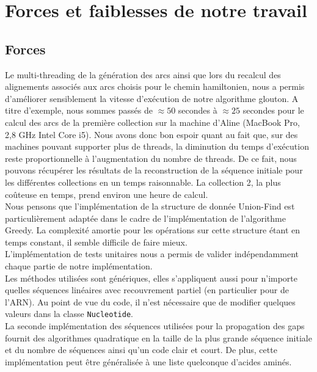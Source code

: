 
\section{Forces et faiblesses de notre travail}

\subsection{Forces}

Le multi-threading de la génération des arcs ainsi que lors du recalcul des alignements associés aux arcs choisis pour le chemin hamiltonien, nous a permis d'améliorer sensiblement la vitesse d'exécution de notre algorithme glouton. A titre d'exemple, nous sommes passés de $\approx 50$ secondes à $\approx 25$ secondes pour le calcul des arcs de la première collection sur la machine d'Aline (MacBook Pro, 2,8 GHz Intel Core i5). Nous avons donc bon espoir quant au fait que, sur des machines pouvant supporter plus de threads, la diminution du temps d'exécution reste proportionnelle à l'augmentation du nombre de threads. De ce fait, nous pouvons récupérer les résultats de la reconstruction de la séquence initiale pour les différentes collections en un temps raisonnable. La collection 2, la plus coûteuse en temps, prend environ une heure de calcul.\\

Nous pensons que l'implémentation de la structure de donnée Union-Find est particulièrement adaptée dans le cadre de l'implémentation de l'algorithme Greedy. La complexité amortie pour les opérations sur cette structure étant en temps constant, il semble difficile de faire mieux.\\

L'implémentation de tests unitaires nous a permis de valider indépendamment chaque partie de notre implémentation.\\

Les méthodes utilisées sont génériques, elles s'appliquent aussi pour n'importe quelles séquences linéaires avec recouvrement partiel (en particulier pour de l'ARN). Au point de vue du code, il n'est nécessaire que de modifier quelques valeurs dans la classe \verb|Nucleotide|.\\

La seconde implémentation des séquences utilisées pour la propagation des gaps
fournit des algorithmes quadratique en la taille de la plus grande séquence initiale et
du nombre de séquences ainsi qu'un code clair et court. De plus, cette
implémentation peut être généralisée à une liste quelconque d'acides aminés.


